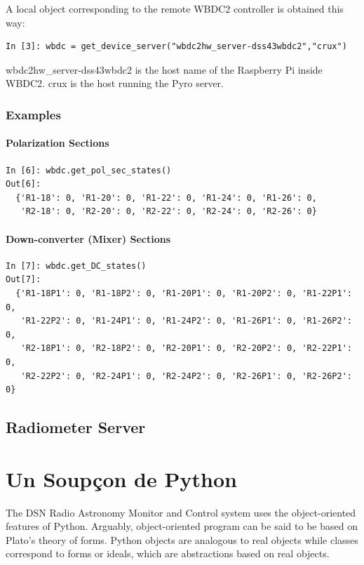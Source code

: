 \documentclass[letterpaper,11pt]{book}
\begin{document}
A local object corresponding to the remote WBDC2 controller is obtained this
way:
\begin{verbatim}
In [3]: wbdc = get_device_server("wbdc2hw_server-dss43wbdc2","crux")
\end{verbatim}
{\ttfamily wbdc2hw\_server-dss43wbdc2} is the host name of the Raspberry Pi
inside WBDC2.  {\ttfamily crux} is the host running the Pyro server.
           

\subsection{Examples}

\subsubsection{Polarization Sections}

\begin{verbatim}
In [6]: wbdc.get_pol_sec_states()
Out[6]:
  {'R1-18': 0, 'R1-20': 0, 'R1-22': 0, 'R1-24': 0, 'R1-26': 0,
   'R2-18': 0, 'R2-20': 0, 'R2-22': 0, 'R2-24': 0, 'R2-26': 0}
\end{verbatim}

\subsubsection{Down-converter (Mixer) Sections}

\begin{verbatim}
In [7]: wbdc.get_DC_states()
Out[7]:
  {'R1-18P1': 0, 'R1-18P2': 0, 'R1-20P1': 0, 'R1-20P2': 0, 'R1-22P1': 0,
   'R1-22P2': 0, 'R1-24P1': 0, 'R1-24P2': 0, 'R1-26P1': 0, 'R1-26P2': 0,
   'R2-18P1': 0, 'R2-18P2': 0, 'R2-20P1': 0, 'R2-20P2': 0, 'R2-22P1': 0,
   'R2-22P2': 0, 'R2-24P1': 0, 'R2-24P2': 0, 'R2-26P1': 0, 'R2-26P2': 0}
\end{verbatim}


\section{Radiometer Server}


\appendix

\chapter{Un Soup\c{c}on de Python}\label{Python}

The DSN Radio Astronomy Monitor and Control system uses the object-oriented
features of Python.  Arguably, object-oriented program can be said to be based
on Plato's theory of forms.  Python objects are analogous to real objects
while classes correspond to forms or ideals, which are abstractions based on
real objects.
\end{document}
